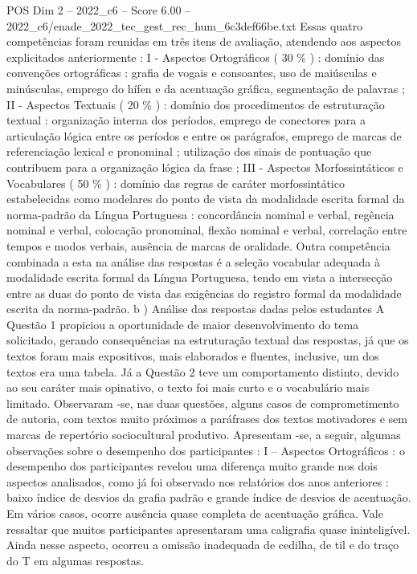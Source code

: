 \begin{textsample}{POS Dim 2 – 2022\_c6 – Score 6.00 – 2022\_c6/enade\_2022\_tec\_gest\_rec\_hum\_6c3def66be.txt}
Essas quatro competências foram reunidas em três itens de avaliação, atendendo aos aspectos explicitados anteriormente : I - Aspectos Ortográficos ( 30 \% ) : domínio das convenções ortográficas : grafia de vogais e consoantes, uso de maiúsculas e minúsculas, emprego do hífen e da acentuação gráfica, segmentação de palavras ; II - Aspectos Textuais ( 20 \% ) : domínio dos procedimentos de estruturação textual : organização interna dos períodos, emprego de conectores para a articulação lógica entre os períodos e entre os parágrafos, emprego de marcas de referenciação lexical e pronominal ; utilização dos sinais de pontuação que contribuem para a organização lógica da frase ; III - Aspectos Morfossintáticos e Vocabulares ( 50 \% ) : domínio das regras de caráter morfossintático estabelecidas como modelares do ponto de vista da modalidade escrita formal da norma-padrão da Língua Portuguesa : concordância nominal e verbal, regência nominal e verbal, colocação pronominal, flexão nominal e verbal, correlação entre tempos e modos verbais, ausência de marcas de oralidade.
Outra competência combinada a esta na análise das respostas é a seleção vocabular adequada à modalidade escrita formal da Língua Portuguesa, tendo em vista a intersecção entre as duas do ponto de vista das exigências do registro formal da modalidade escrita da norma-padrão. b ) Análise das respostas dadas pelos estudantes A Questão 1 propiciou a oportunidade de maior desenvolvimento do tema solicitado, gerando consequências na estruturação textual das respostas, já que os textos foram mais expositivos, mais elaborados e fluentes, inclusive, um dos textos era uma tabela.
Já a Questão 2 teve um comportamento distinto, devido ao seu caráter mais opinativo, o texto foi mais curto e o vocabulário mais limitado.
Observaram -se, nas duas questões, alguns casos de comprometimento de autoria, com textos muito próximos a paráfrases dos textos motivadores e sem marcas de repertório sociocultural produtivo.
Apresentam -se, a seguir, algumas observações sobre o desempenho dos participantes : I – Aspectos Ortográficos : o desempenho dos participantes revelou uma diferença muito grande nos dois aspectos analisados, como já foi observado nos relatórios dos anos anteriores : baixo índice de desvios da grafia padrão e grande índice de desvios de acentuação.
Em vários casos, ocorre ausência quase completa de acentuação gráfica.
Vale ressaltar que muitos participantes apresentaram uma caligrafia quase ininteligível.
Ainda nesse aspecto, ocorreu a omissão inadequada de cedilha, de til e do traço do T em algumas respostas.

\end{textsample}
